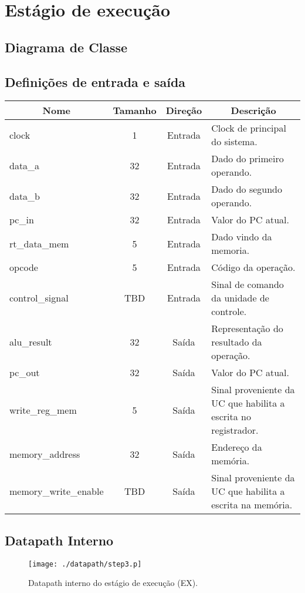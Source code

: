 \section{Estágio de execução}
	\subsection{Diagrama de Classe}
  \begin{figure}[h]
    
  \end{figure}
		
		\subsection{Definições de entrada e saída}
		
	\begin{center}
		\begin{longtable}[pos]{| l | c | c | m{7cm} |} \hline
			\multicolumn{1}{|c|}{\cellcolor[gray]{0.9}\textbf{Nome}} & 
			\multicolumn{1}{c|}{\cellcolor[gray]{0.9}\textbf{Tamanho}} & 
			\multicolumn{1}{c|}{\cellcolor[gray]{0.9}\textbf{Direção}} &
			\multicolumn{1}{c|}{\cellcolor[gray]{0.9}\textbf{Descrição}} \\ \hline
			\endhead
			\hline
			\endlastfoot
			
			clock & 1 & Entrada & Clock de principal do sistema.\\ \hline
			data\_a & 32 & Entrada & Dado do primeiro operando. \\ \hline
			data\_b & 32 & Entrada & Dado do segundo operando. \\ \hline
			pc\_in & 32 & Entrada & Valor do PC atual. \\ \hline
			rt\_data\_mem & 5 & Entrada & Dado vindo da memoria. \\ \hline
			opcode & 5 & Entrada & Código da operação.\\ \hline
			control\_signal & TBD & Entrada & Sinal de comando da unidade de controle. \\ \hline
			alu\_result & 32 & Saída & Representação do resultado da operação. \\ \hline
			pc\_out & 32 & Saída & Valor do PC atual. \\ \hline
			write\_reg\_mem & 5 & Saída & Sinal proveniente da UC que habilita a escrita no registrador. \\ \hline
			memory\_address & 32 & Saída & Endereço da memória. \\ \hline
			memory\_write\_enable & TBD & Saída & Sinal proveniente da UC que habilita a escrita na memória.
			
		\end{longtable}
	\end{center}
	
	\subsection{Datapath Interno}
	
	\begin{figure}[ht]
		\begin{center}
		\texttt{[image: ./datapath/step3.p]}
		\caption*{Datapath interno do estágio de execução (EX).}
		\end{center}
	\end{figure}
